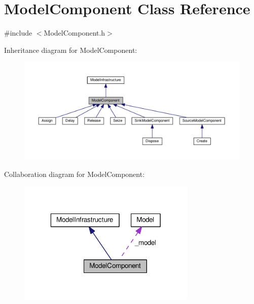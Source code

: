 \hypertarget{class_model_component}{\section{Model\-Component Class Reference}
\label{class_model_component}
}


{\ttfamily \#include $<$Model\-Component.\-h$>$}



Inheritance diagram for Model\-Component\-:
\nopagebreak
\begin{figure}[H]
\begin{center}
\leavevmode
\includegraphics[width=350pt]{class_model_component__inherit__graph}
\end{center}
\end{figure}


Collaboration diagram for Model\-Component\-:
\nopagebreak
\begin{figure}[H]
\begin{center}
\leavevmode
\includegraphics[width=241pt]{class_model_component__coll__graph}
\end{center}
\end{figure}
